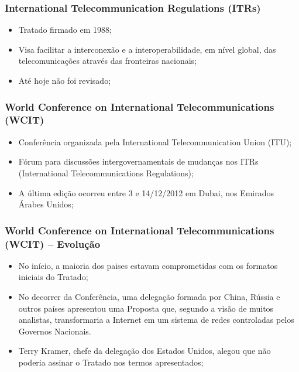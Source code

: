 \documentclass{beamer}
\begin{document}

\begin{frame}
\frametitle{International Telecommunication Regulations (ITRs)}
\begin{itemize}
\item Tratado firmado em 1988;
\item Visa facilitar a interconexão e a interoperabilidade, em nível global, das telecomunicações através das fronteiras nacionais;
\item Até hoje não foi revisado;
\end{itemize}
\end{frame}


\begin{frame}
\frametitle{World Conference on International Telecommunications (WCIT)}
\begin{itemize}
\item Conferência organizada pela International Telecommunication Union (ITU);
\item Fórum para discussões intergovernamentais de mudanças nos ITRs (International Telecommunications Regulations); 
\item A última edição ocorreu entre 3 e 14/12/2012 em Dubai, nos Emirados Árabes Unidos;
\end{itemize}
\end{frame}


\begin{frame}
\frametitle{World Conference on International Telecommunications (WCIT) -- Evolução}
\begin{itemize}
\item No início, a maioria dos paises estavam comprometidas com os formatos iniciais do Tratado;
\item No decorrer da Conferência, uma delegação formada por China, Rússia e outros países apresentou uma Proposta que, segundo a visão de muitos analistas, transformaria a Internet em um sistema de redes controladas pelos Governos Nacionais.
\item Terry Kramer, chefe da delegação dos Estados Unidos, alegou que não poderia assinar o Tratado nos termos apresentados;
\end{itemize}
\end{frame}

\end{document}
